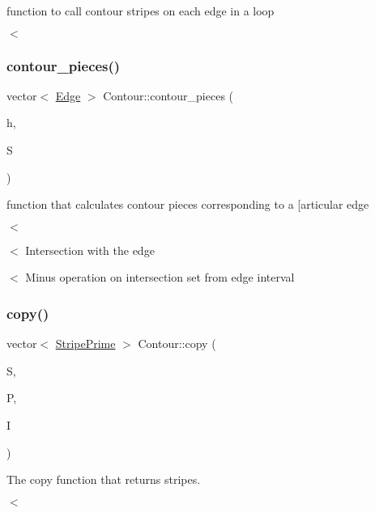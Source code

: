 function to call contour stripes on each edge in a loop 

$<$ \mbox{\label{classContour_a26b1f58c0345adaaec14bd7493d16ed2}} 
\subsubsection{\texorpdfstring{contour\+\_\+pieces()}{contour\_pieces()}}
{\footnotesize\ttfamily vector$<$ \hyperlink{classEdge}{Edge} $>$ Contour\+::contour\+\_\+pieces (\begin{DoxyParamCaption}\item[{\hyperlink{classEdge}{Edge}}]{h,  }\item[{vector$<$ \hyperlink{classStripePrime}{Stripe\+Prime} $>$ \&}]{S }\end{DoxyParamCaption})}



function that calculates contour pieces corresponding to a \mbox{[}articular edge 

$<$

$<$ Intersection with the edge

$<$ Minus operation on intersection set from edge interval \mbox{\label{classContour_a6eb03ad9779df6fabdb541f75a64ea92}} 
\subsubsection{\texorpdfstring{copy()}{copy()}}
{\footnotesize\ttfamily vector$<$ \hyperlink{classStripePrime}{Stripe\+Prime} $>$ Contour\+::copy (\begin{DoxyParamCaption}\item[{vector$<$ \hyperlink{classStripePrime}{Stripe\+Prime} $>$ \&}]{S,  }\item[{vector$<$ float $>$ \&}]{P,  }\item[{\hyperlink{classInterval}{Interval}}]{I }\end{DoxyParamCaption})}



The copy function that returns stripes. 

$<$ \mbox{\label{classContour_a33d8bf3ecbf269674b48d35310d01800}} 
